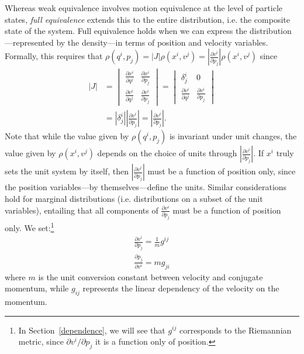 \documentclass[letterpaper]{article}
\begin{document}
Whereas weak equivalence involves motion equivalence at the level of particle states, \textit{full equivalence} extends this to the entire distribution, i.e. the composite state of the system. Full equivalence holds when we can express the distribution---represented by the density---in terms of position and velocity variables. Formally, this requires that $\rho(q^i, p_j) = |J| \rho(x^i, v^j) = \left|\frac{\partial v^i}{\partial p_j}\right| \rho(x^i, v^j)$ since
\begin{equation}
\begin{aligned}
|J| &= \begin{vmatrix}
\frac{\partial x^i}{\partial q^j} & \frac{\partial x^i}{\partial p_j} \\
\frac{\partial v^i}{\partial q^j} & \frac{\partial v^i}{\partial p_j}
\end{vmatrix}
= \begin{vmatrix}
\delta^i_j & 0 \\
\frac{\partial v^i}{\partial q^j} & \frac{\partial v^i}{\partial p_j}
\end{vmatrix} \\
&= \left|\delta^i_j\right| \left|\frac{\partial v^i}{\partial p_j}\right| 
= \left|\frac{\partial v^i}{\partial p_j}\right|.
\end{aligned}
\end{equation}
Note that while the value given by $\rho(q^i, p_j)$ is invariant under unit changes, the value given by $\rho(x^i, v^j)$ depends on the choice of units through $\left|\frac{\partial v^i}{\partial p_j}\right|$. If $x^i$ truly sets the unit system by itself, then $\left|\frac{\partial v^i}{\partial p_j}\right|$ must be a function of position only, since the position variables---by themselves---define the units. Similar considerations hold for marginal distributions (i.e. distributions on a subset of the unit variables), entailing that all components of $\frac{\partial v^i}{\partial p_j}$ must be a function of position only. We set:\footnote{In Section~\ref{dependence}, we will see that $g^{ij}$ corresponds to the Riemannian metric, since $\partial v^i/\partial p_j$ it is a function only of position.}
\begin{equation}
\begin{aligned}
\frac{\partial v^i}{\partial p_j} = \frac{1}{m} g^{ij} \\
\frac{\partial p_j}{\partial v^i} = m g_{ji}
\end{aligned}
\end{equation}
where $m$ is the unit conversion constant between velocity and conjugate momentum, while $g_{ij}$ represents the linear dependency of the velocity on the momentum. 
\end{document}
